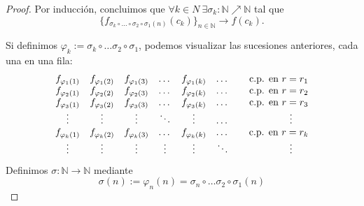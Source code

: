 \begin{proof}
    Por inducci\'on, concluimos que
    $
    \forall k\in N \ \exists \sigma_k :\mathbb N \nearrow \mathbb N
    $ tal que
    \[
      \{ f_{\sigma_k \circ \dots \circ \sigma_2 \circ\sigma_1 (n)}
      (c_k) \}_{n\in\mathbb N} \longrightarrow f(c_k).
    \]

    Si definimos $\varphi_k:= \sigma_k \circ \dots \sigma_2 \circ\sigma_1$, podemos visualizar las sucesiones anteriores, cada una en una fila:
    \[
      \begin{array}{ccccccc}
        {f_{\varphi_1 (1)}}& f_{\varphi_1 (2)} & f_{\varphi_1 (3)} & \dots &f_{\varphi_1 (k)} & \dots & \hspace{0.25cm} \mbox{ c.p. en } r=r_1
        \\
        f_{\varphi_2 (1)} & {f_{\varphi_2 (2)}} & f_{\varphi_2 (3)} & \dots &f_{\varphi_2 (k)} & \dots & \hspace{0.25cm} \mbox{ c.p. en } r=r_2
        \\
        f_{\varphi_3 (1)} & f_{\varphi_3 (2)} & {f_{\varphi_3 (3)}} & \dots &f_{\varphi_3 (k)} & \dots & \hspace{0.25cm} \mbox{ c.p. en } r=r_3
        \\
        \vdots & \vdots & \vdots& \ddots &\vdots & \dots & \hspace{1.25cm} \vdots
        \\
        f_{\varphi_k (1)} & f_{\varphi_k (2)} & f_{\varphi_k (3)} & \dots &{f_{\varphi_k (k)}} & \dots & \hspace{0.25cm} \mbox{ c.p. en } r=r_k
        \\
        \vdots & \vdots & \vdots& \vdots &\vdots & \ddots & \hspace{1.25cm} \vdots
      \end{array}
    \]
    Definimos $\sigma:\mathbb N\longrightarrow \mathbb N$ mediante
    \[
      \sigma (n):= \varphi_n(n)= \sigma_n \circ \dots \sigma_2 \circ\sigma_1 (n)
    \]


\end{proof}
